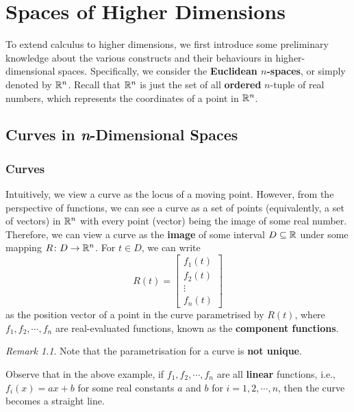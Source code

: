 \documentclass[math]{amznotes}
\theoremstyle{remark}
\newtheorem*{remark}{Remark}
\begin{document}
\tableofcontents

\chapter{Spaces of Higher Dimensions}
To extend calculus to higher dimensions, we first introduce some preliminary knowledge about the various constructs and their behaviours in higher-dimensional spaces. Specifically, we consider the {\color{red} \textbf{Euclidean $n$-spaces}}, or simply denoted by $\mathbb{R}^n$. Recall that $\mathbb{R}^n$ is just the set of all {\color{red} \textbf{ordered}} $n$-tuple of real numbers, which represents the coordinates of a point in $\mathbb{R}^n$.
\section{Curves in \textit{n}-Dimensional Spaces}
\subsection{Curves}
Intuitively, we view a curve as the locus of a moving point. However, from the perspective of functions, we can see a curve as a set of points (equivalently, a set of vectors) in $\mathbb{R}^n$ with every point (vector) being the image of some real number. Therefore, we can view a curve as the {\color{red} \textbf{image}} of some interval $D \subseteq \mathbb{R}$ under some mapping $R \colon D \to \mathbb{R}^n$. For $t \in D$, we can write
\begin{equation*}
    R(t) = \left[\begin{array}{c}
            f_1(t) \\
            f_2(t) \\
            \vdots \\
            f_n(t)
        \end{array}\right]
\end{equation*}
as the position vector of a point in the curve parametrised by $R(t)$, where $f_1, f_2, \cdots, f_n$ are real-evaluated functions, known as the {\color{red} \textbf{component functions}}.
\begin{notebox}
    \begin{remark}
        Note that the parametrisation for a curve is {\color{red} \textbf{not unique}}.
    \end{remark}
\end{notebox}
Observe that in the above example, if $f_1, f_2, \cdots, f_n$ are all {\color{red} \textbf{linear}} functions, i.e., $f_i(x) = ax + b$ for some real constants $a$ and $b$ for $i = 1, 2, \cdots, n$, then the curve becomes a straight line.
\end{document}
